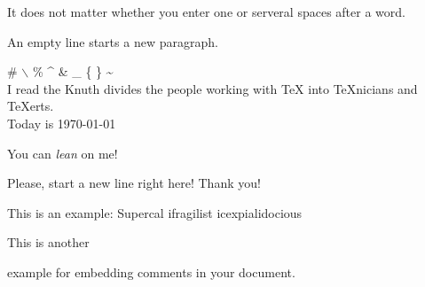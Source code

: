 \documentclass{article}
\begin{document}
It does not matter whether you 
enter one or serveral    		spaces
after a word.

An empty line starts 
a new paragraph.

\#
$\backslash$ %
\%
\^{}
\&
\_
\{
\}
\~{}
\\

I read the Knuth divides the
people working with \TeX{} into \TeX{}nicians and \TeX erts.\\
Today is \today %

You can \textsl{lean} on me!

Please, start a new line
right here!\newline
Thank you!

This is an %
example: Supercal%
			ifragilist%
	icexpialidocious

This is another
\begin{comment}
rather supid,
but help
\end{comment}
example for embedding comments in your document.
\end{document}
